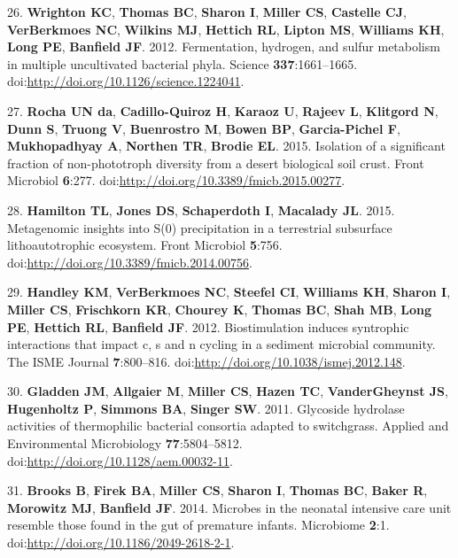 \documentclass[11pt,]{article}
\begin{document}
26. \textbf{Wrighton KC}, \textbf{Thomas BC}, \textbf{Sharon I},
\textbf{Miller CS}, \textbf{Castelle CJ}, \textbf{VerBerkmoes NC},
\textbf{Wilkins MJ}, \textbf{Hettich RL}, \textbf{Lipton MS},
\textbf{Williams KH}, \textbf{Long PE}, \textbf{Banfield JF}. 2012.
Fermentation, hydrogen, and sulfur metabolism in multiple uncultivated
bacterial phyla. Science \textbf{337}:1661--1665.
doi:\url{http://doi.org/10.1126/science.1224041}.

27. \textbf{Rocha UN da}, \textbf{Cadillo-Quiroz H}, \textbf{Karaoz U},
\textbf{Rajeev L}, \textbf{Klitgord N}, \textbf{Dunn S}, \textbf{Truong
V}, \textbf{Buenrostro M}, \textbf{Bowen BP}, \textbf{Garcia-Pichel F},
\textbf{Mukhopadhyay A}, \textbf{Northen TR}, \textbf{Brodie EL}. 2015.
Isolation of a significant fraction of non-phototroph diversity from a
desert biological soil crust. Front Microbiol \textbf{6}:277.
doi:\url{http://doi.org/10.3389/fmicb.2015.00277}.

28. \textbf{Hamilton TL}, \textbf{Jones DS}, \textbf{Schaperdoth I},
\textbf{Macalady JL}. 2015. Metagenomic insights into S(0) precipitation
in a terrestrial subsurface lithoautotrophic ecosystem. Front Microbiol
\textbf{5}:756. doi:\url{http://doi.org/10.3389/fmicb.2014.00756}.

29. \textbf{Handley KM}, \textbf{VerBerkmoes NC}, \textbf{Steefel CI},
\textbf{Williams KH}, \textbf{Sharon I}, \textbf{Miller CS},
\textbf{Frischkorn KR}, \textbf{Chourey K}, \textbf{Thomas BC},
\textbf{Shah MB}, \textbf{Long PE}, \textbf{Hettich RL},
\textbf{Banfield JF}. 2012. Biostimulation induces syntrophic
interactions that impact c, s and n cycling in a sediment microbial
community. The ISME Journal \textbf{7}:800--816.
doi:\url{http://doi.org/10.1038/ismej.2012.148}.

30. \textbf{Gladden JM}, \textbf{Allgaier M}, \textbf{Miller CS},
\textbf{Hazen TC}, \textbf{VanderGheynst JS}, \textbf{Hugenholtz P},
\textbf{Simmons BA}, \textbf{Singer SW}. 2011. Glycoside hydrolase
activities of thermophilic bacterial consortia adapted to switchgrass.
Applied and Environmental Microbiology \textbf{77}:5804--5812.
doi:\url{http://doi.org/10.1128/aem.00032-11}.

31. \textbf{Brooks B}, \textbf{Firek BA}, \textbf{Miller CS},
\textbf{Sharon I}, \textbf{Thomas BC}, \textbf{Baker R},
\textbf{Morowitz MJ}, \textbf{Banfield JF}. 2014. Microbes in the
neonatal intensive care unit resemble those found in the gut of
premature infants. Microbiome \textbf{2}:1.
doi:\url{http://doi.org/10.1186/2049-2618-2-1}.
\end{document}
